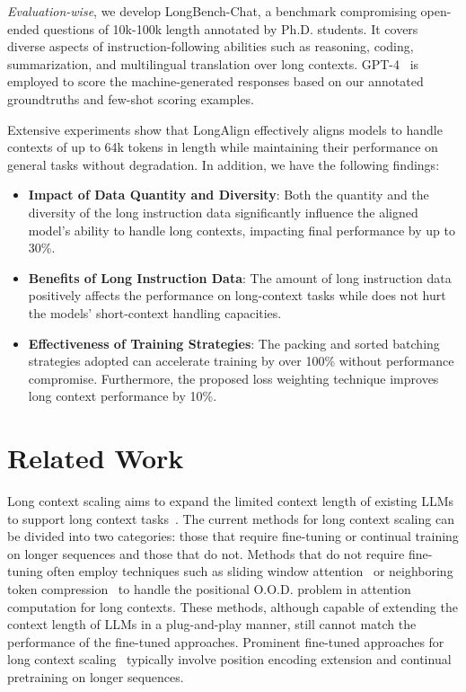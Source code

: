 \textit{Evaluation-wise}, we develop LongBench-Chat, a benchmark compromising open-ended questions of 10k-100k length annotated by Ph.D. students. 
It covers diverse aspects of instruction-following abilities such as reasoning, coding, summarization, and multilingual translation over long contexts. 
GPT-4~\cite{GPT-4} is employed to score the machine-generated responses based on our annotated groundtruths and few-shot scoring examples. 

Extensive experiments show that LongAlign effectively aligns models to handle contexts of up to 64k tokens in length while maintaining their performance on general tasks without degradation. 
In addition, we have the following findings: 
\begin{itemize}[itemsep=0pt, leftmargin=*]
    \item \textbf{Impact of Data Quantity and Diversity}: 
    Both the quantity and the diversity of the long instruction data significantly influence the aligned model's ability to handle long contexts, impacting final performance by up to 30\%. 
    
    \item \textbf{Benefits of Long Instruction Data}: 
    The amount of long instruction data positively affects the performance on long-context tasks while does not hurt the models' short-context handling capacities. 
    
    \item \textbf{Effectiveness of Training Strategies}: 
    The packing and sorted batching strategies adopted can accelerate training by over 100\% without  performance compromise. 
    Furthermore, the proposed loss weighting technique improves long context performance by 10\%.
\end{itemize}

\section{Related Work}
\label{sec:related}

Long context scaling aims to expand the limited context length of existing LLMs to support long context tasks~\cite{xiong2023effective}. The current methods for long context scaling can be divided into two categories: those that require fine-tuning or continual training on longer sequences and those that do not.
Methods that do not require fine-tuning often employ techniques such as sliding window attention~\cite{han2023lm,xiao2023efficient} or neighboring token compression~\cite{jiang2023longllmlingua,zhang2024soaring,jin2024llm} to handle the positional O.O.D. problem in attention computation for long contexts.
These methods, although capable of extending the context length of LLMs in a plug-and-play manner, still cannot match the performance of the fine-tuned approaches.
Prominent fine-tuned approaches for long context scaling~\cite{chen2023extending,peng2023yarn,xiong2023effective,chen2023longlora,zhu2023pose,fu2023longdata} typically involve position encoding extension and continual pretraining on longer sequences.


